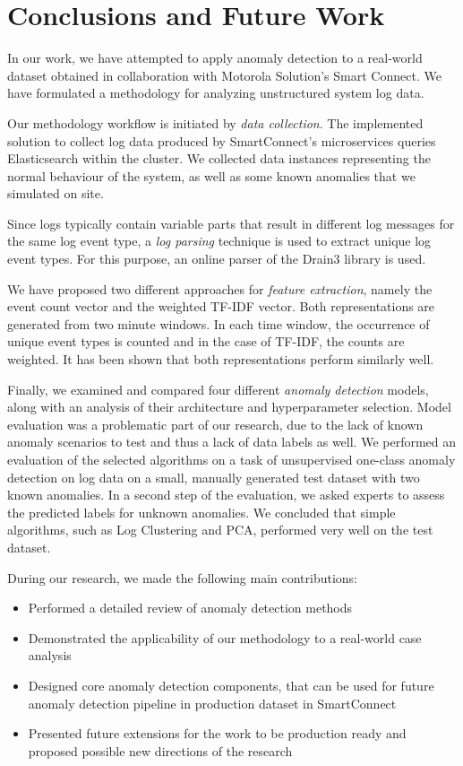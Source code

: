 \chapter{Conclusions and Future Work}
\label{conclusion}
In our work, we have attempted to apply anomaly detection to a real-world dataset obtained in collaboration with Motorola Solution's Smart Connect. We have formulated a methodology for analyzing unstructured system log data. 

Our methodology workflow is initiated by \textit{data collection}. The implemented solution to collect log data produced by SmartConnect's microservices queries Elasticsearch within the cluster. We collected data instances representing the normal behaviour of the system, as well as some known anomalies that we simulated on site.

Since logs typically contain variable parts that result in different log messages for the same log event type, a \textit{log parsing} technique is used to extract unique log event types. For this purpose, an online parser of the Drain3 library is used. 

We have proposed two different approaches for \textit{feature extraction}, namely the event count vector and the weighted TF-IDF vector. Both representations are generated from two minute windows. In each time window, the occurrence of unique event types is counted and in the case of TF-IDF, the counts are weighted. It has been shown that both representations perform similarly well.

Finally, we examined and compared four different \textit{anomaly detection} models, along with an analysis of their architecture and hyperparameter selection. Model evaluation was a problematic part of our research, due to the lack of known anomaly scenarios to test and thus a lack of data labels as well. We performed an evaluation of the selected algorithms on a task of unsupervised one-class anomaly detection on log data on a small, manually generated test dataset with two known anomalies. In a second step of the evaluation, we asked experts to assess the predicted labels for unknown anomalies. We concluded that simple algorithms, such as Log Clustering and PCA, performed very well on the test dataset.

During our research, we made the following main contributions:

\begin{itemize}
    \item Performed a detailed review of anomaly detection methods
    \item Demonstrated the applicability of our methodology to a real-world case analysis
    \item Designed core anomaly detection components, that can be used for future anomaly detection pipeline in production dataset in SmartConnect
    \item Presented future extensions for the work to be production ready and proposed possible new directions of the research
\end{itemize}

